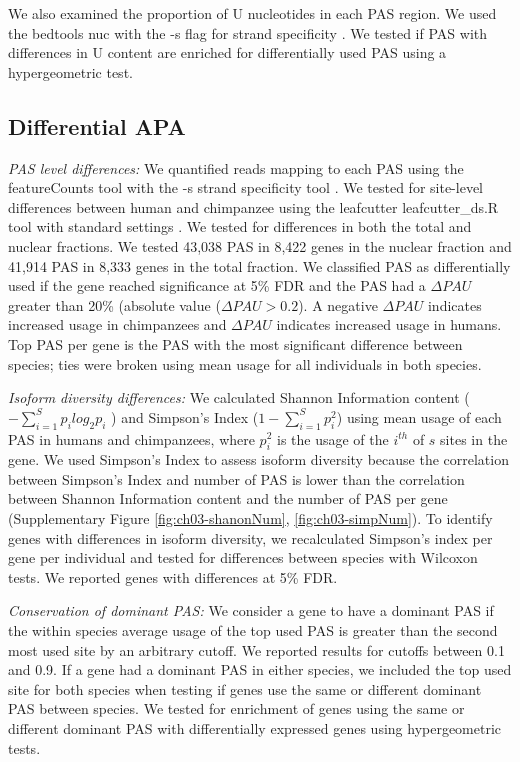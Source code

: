 We also examined the proportion of U nucleotides in each PAS region. We used the bedtools nuc with the -s flag for strand specificity \citep{quinlan_bedtools_2010}. We tested if PAS with differences in U content are enriched for differentially used PAS using a hypergeometric test. 


\subsection{Differential APA}\label{dAPA} 

\emph{PAS level differences:} We quantified reads mapping to each PAS using the featureCounts tool with the -s strand specificity tool \citep{liao_featurecounts_2014}. We tested for site-level differences between human and chimpanzee using the leafcutter leafcutter\_ds.R tool with standard settings \citep{li_annotation-free_2018}. We tested for differences in both the total and nuclear fractions. We tested 43,038 PAS in 8,422 genes in the nuclear fraction and 41,914 PAS in 8,333 genes in the total fraction. We classified PAS as differentially used if the gene reached significance at 5\% FDR and the PAS had a $\Delta PAU$ greater than 20\% (absolute value ($\Delta PAU > 0.2$). A negative $\Delta PAU$ indicates increased usage in chimpanzees and $\Delta PAU$ indicates increased usage in humans. Top PAS per gene is the PAS with the most significant difference between species; ties were broken using mean usage for all individuals in both species. 

\emph{Isoform diversity differences:} We calculated Shannon Information content ( $- \sum_{i=1}^{S} p_{i}log_{2}p_{i}$ ) and Simpson's Index ($1 - \sum_{i=1}^{S} p^{2}_{i}$) using mean usage of each PAS in humans and chimpanzees, where $p_{i}^{2}$ is the usage of the $i^{th}$ of $s$ sites in the gene. We used Simpson's Index to assess isoform diversity because the correlation between Simpson's Index and number of PAS is lower than the correlation between Shannon Information content and the number of PAS per gene (Supplementary Figure \ref{fig:ch03-shanonNum}, \ref{fig:ch03-simpNum}). To identify genes with differences in isoform diversity, we recalculated Simpson's index per gene per individual and tested for differences between species with Wilcoxon tests. We reported genes with differences at 5\% FDR.  

\emph{Conservation of dominant PAS:}  We consider a gene to have a dominant PAS if the within species average usage of the top used PAS is greater than the second most used site by an arbitrary cutoff. We reported results for cutoffs between 0.1 and 0.9. If a gene had a dominant PAS in either species, we included the top used site for both species when testing if genes use the same or different dominant PAS between species. We tested for enrichment of genes using the same or different dominant PAS with differentially expressed genes using hypergeometric tests.

